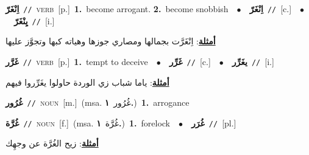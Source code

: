\documentclass[10pt,a4paper,twoside]{article} %
\begin{document}
\begin{multicols}{2}
{\setlength\topsep{0pt}\textbf{\foreignlanguage{arabic}{اِنْغَرّ}}\ {\color{gray}\texttt{//}\color{black}}\ \textsc{verb}\ [p.]\ \textbf{1.}~become arrogant.  \textbf{2.}~become snobbish\ \ $\bullet$\ \ \setlength\topsep{0pt}\textbf{\foreignlanguage{arabic}{اِنْغَرّ}}\ {\color{gray}\texttt{//}\color{black}}\ [c.]\ \ $\bullet$\ \ \setlength\topsep{0pt}\textbf{\foreignlanguage{arabic}{يِنْغَرّ}}\ {\color{gray}\texttt{//}\color{black}}\ [i.]\  \begin{flushright}\color{gray}\foreignlanguage{arabic}{\textbf{\underline{\foreignlanguage{arabic}{أمثلة}}}: اِنْغَرَّت بجمالها ومصاري جوزها وهياته كبها وتجوَّز عليها}\end{flushright}\color{black}} \vspace{2mm}

{\setlength\topsep{0pt}\textbf{\foreignlanguage{arabic}{غَرَّر}}\ {\color{gray}\texttt{//}\color{black}}\ \textsc{verb}\ [p.]\ \textbf{1.}~tempt to deceive\ \ $\bullet$\ \ \setlength\topsep{0pt}\textbf{\foreignlanguage{arabic}{غَرِّر}}\ {\color{gray}\texttt{//}\color{black}}\ [c.]\ \ $\bullet$\ \ \setlength\topsep{0pt}\textbf{\foreignlanguage{arabic}{يغَرِّر}}\ {\color{gray}\texttt{//}\color{black}}\ [i.]\  \begin{flushright}\color{gray}\foreignlanguage{arabic}{\textbf{\underline{\foreignlanguage{arabic}{أمثلة}}}: ياما شباب زي الوردة حاولوا يغَرِّروا فيهم}\end{flushright}\color{black}} \vspace{2mm}

{\setlength\topsep{0pt}\textbf{\foreignlanguage{arabic}{غُرُور}}\ {\color{gray}\texttt{//}\color{black}}\ \textsc{noun}\ [m.]\ \color{gray}(msa. \foreignlanguage{arabic}{غُرُور}~\foreignlanguage{arabic}{\textbf{١.}})\color{black}\ \textbf{1.}~arrogance\ } \vspace{2mm}

{\setlength\topsep{0pt}\textbf{\foreignlanguage{arabic}{غُرَّة}}\ {\color{gray}\texttt{//}\color{black}}\ \textsc{noun}\ [f.]\ \color{gray}(msa. \foreignlanguage{arabic}{غُرَّة}~\foreignlanguage{arabic}{\textbf{١.}})\color{black}\ \textbf{1.}~forelock\ \ $\bullet$\ \ \setlength\topsep{0pt}\textbf{\foreignlanguage{arabic}{غُرَر}}\ {\color{gray}\texttt{//}\color{black}}\ [pl.]\  \begin{flushright}\color{gray}\foreignlanguage{arabic}{\textbf{\underline{\foreignlanguage{arabic}{أمثلة}}}: زيح الغُرَّة عن وجهِك}\end{flushright}\color{black}} \vspace{2mm}


\end{multicols}
\end{document}
